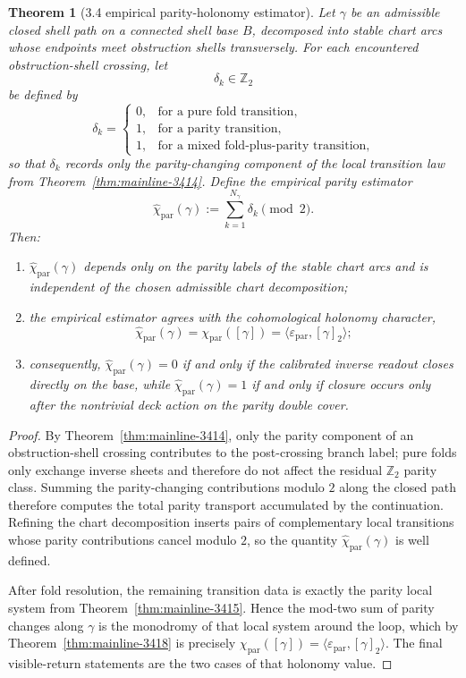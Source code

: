 \documentclass[12pt,a4paper]{article}
\newtheorem{theorem}{Theorem}[section]
\begin{document}
\begin{theorem}[3.4 empirical parity-holonomy estimator]
\label{thm:mainline-3419}
Let $\gamma$ be an admissible closed shell path on a connected shell base $B$, decomposed into stable chart arcs whose endpoints meet obstruction shells transversely. For each encountered obstruction-shell crossing, let
\[
 \delta_k\in\mathbb Z_2
\]
be defined by
\[
 \delta_k=
 \begin{cases}
 0,&\text{for a pure fold transition},\\
 1,&\text{for a parity transition},\\
 1,&\text{for a mixed fold-plus-parity transition},
 \end{cases}
\]
so that $\delta_k$ records only the parity-changing component of the local transition law from Theorem~\ref{thm:mainline-3414}. Define the empirical parity estimator
\[
 \widehat\chi_{\mathrm{par}}(\gamma)
 :=
 \sum_{k=1}^{N_\gamma}\delta_k \pmod 2.
\]
Then:
\begin{enumerate}[label=(\roman*)]
 \item $\widehat\chi_{\mathrm{par}}(\gamma)$ depends only on the parity labels of the stable chart arcs and is independent of the chosen admissible chart decomposition;
 \item the empirical estimator agrees with the cohomological holonomy character,
 \[
 \widehat\chi_{\mathrm{par}}(\gamma)
 =
 \chi_{\mathrm{par}}([\gamma])
 =
 \langle \varepsilon_{\mathrm{par}},[\gamma]_2\rangle;
 \]
 \item consequently, $\widehat\chi_{\mathrm{par}}(\gamma)=0$ if and only if the calibrated inverse readout closes directly on the base, while $\widehat\chi_{\mathrm{par}}(\gamma)=1$ if and only if closure occurs only after the nontrivial deck action on the parity double cover.
\end{enumerate}
\end{theorem}

\begin{proof}
By Theorem~\ref{thm:mainline-3414}, only the parity component of an obstruction-shell crossing contributes to the post-crossing branch label; pure folds only exchange inverse sheets and therefore do not affect the residual $\mathbb Z_2$ parity class. Summing the parity-changing contributions modulo $2$ along the closed path therefore computes the total parity transport accumulated by the continuation. Refining the chart decomposition inserts pairs of complementary local transitions whose parity contributions cancel modulo $2$, so the quantity $\widehat\chi_{\mathrm{par}}(\gamma)$ is well defined.

After fold resolution, the remaining transition data is exactly the parity local system from Theorem~\ref{thm:mainline-3415}. Hence the mod-two sum of parity changes along $\gamma$ is the monodromy of that local system around the loop, which by Theorem~\ref{thm:mainline-3418} is precisely $\chi_{\mathrm{par}}([\gamma])=\langle \varepsilon_{\mathrm{par}},[\gamma]_2\rangle$. The final visible-return statements are the two cases of that holonomy value.
\end{proof}
\end{document}
